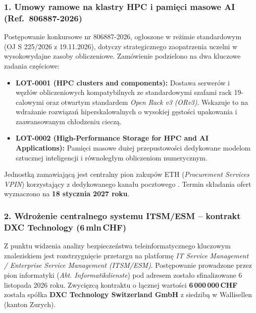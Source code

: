 \subsubsection*{1. Umowy ramowe na klastry HPC i pamięci masowe AI (Ref.\ 806887-2026)}

Postępowanie konkursowe nr 806887-2026, ogłoszone w reżimie standardowym (OJ S 225/2026 z 19.11.2026), dotyczy strategicznego zaopatrzenia uczelni w wysokowydajne zasoby obliczeniowe. Zamówienie podzielono na dwa kluczowe zadania częściowe:
\begin{itemize}
    \item \textbf{LOT-0001 (HPC clusters and components):} Dostawa serwerów i węzłów obliczeniowych kompatybilnych ze standardowymi szafami rack 19-calowymi oraz otwartym standardem \textit{Open Rack v3 (ORv3)}. Wskazuje to na wdrażanie rozwiązań hiperskalowalnych o wysokiej gęstości upakowania i zaawansowanym chłodzeniu cieczą.
    \item \textbf{LOT-0002 (High-Performance Storage for HPC and AI Applications):} Pamięci masowe dużej przepustowości dedykowane modelom sztucznej inteligencji i równoległym obliczeniom numerycznym.
\end{itemize}
Jednostką zamawiającą jest centralny pion zakupów ETH (\textit{Procurement Services VPIN}) korzystający z dedykowanego kanału pocztowego . Termin składania ofert wyznaczono na \textbf{18 stycznia 2027 roku}.


\subsubsection*{2. Wdrożenie centralnego systemu ITSM/ESM -- kontrakt DXC Technology (6\,mln\,CHF)}

Z punktu widzenia analizy bezpieczeństwa teleinformatycznego kluczowym znaleziskiem jest rozstrzygnięcie przetargu na platformę \textit{IT Service Management / Enterprise Service Management (ITSM/ESM)}. Postępowanie prowadzone przez pion informatyki (\textit{Abt. Informatikdienste}) pod adresem  zostało sfinalizowane 6 listopada 2026 roku. Zwycięzcą kontraktu o łącznej wartości \textbf{6\,000\,000\,CHF} została spółka \textbf{DXC Technology Switzerland GmbH} z siedzibą w Wallisellen (kanton Zurych).

